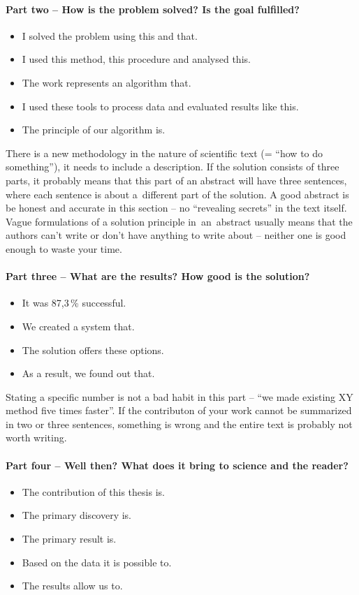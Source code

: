 \paragraph{Part two -- How is the problem solved? Is the goal fulfilled?}
\begin{itemize}
  \item{I solved the problem using this and that.}
  \item{I used this method, this procedure and analysed this.}
  \item{The work represents an algorithm that.}
  \item{I used these tools to process data and evaluated results like this.}
  \item{The principle of our algorithm is.}
\end{itemize}

There is a new methodology in the nature of scientific text (= ``how to do something''), it needs to include a description. If the solution consists of three parts, it probably means that this part of an abstract will have three sentences, where each sentence is about a~different part of the solution. A good abstract is be honest and accurate in this section -- no ``revealing secrets'' in the text itself. Vague formulations of a solution principle in~an~abstract usually means that the authors can't write or don't have anything to write about -- neither one is good enough to waste your time.

\paragraph{Part three -- What are the results? How good is the solution?}
\begin{itemize}
  \item{It was 87,3\,\% successful.}
  \item{We created a system that.}
  \item{The solution offers these options.}
  \item{As a result, we found out that.}
\end{itemize}

Stating a specific number is not a bad habit in this part -- ``we made existing XY method five times faster''. If the contributon of your work cannot be summarized in two or three sentences, something is wrong and the entire text is probably not worth writing.

\paragraph{Part four -- Well then? What does it bring to science and the reader?}
\begin{itemize}
  \item{The contribution of this thesis is.}
  \item{The primary discovery is.}
  \item{The primary result is.}
  \item{Based on the data it is possible to.}
  \item{The results allow us to.}
\end{itemize}

